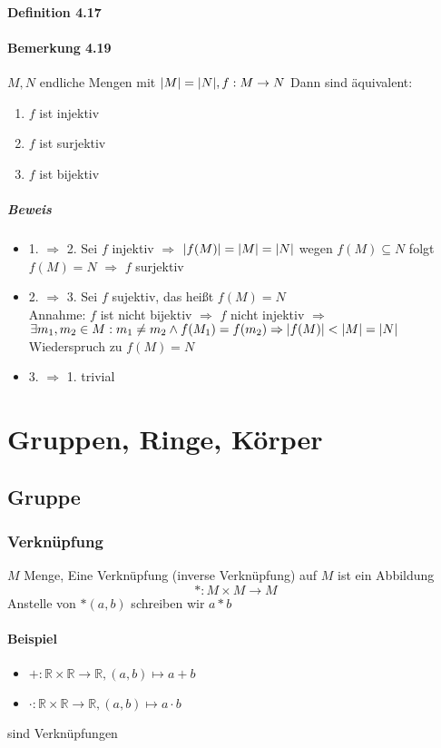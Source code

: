 \documentclass[a4paper]{scrartcl}
\DeclarePairedDelimiter\abs{\lvert}{\rvert}%
\begin{document}
\paragraph{Definition 4.17}
\label{sec-2-6-7-9}
\paragraph{Bemerkung 4.19}
\label{sec-2-6-7-10}
$M,N$ endliche Mengen mit $\abs{M} = \abs{N},f:M\to N$ Dann sind äquivalent:
\begin{enumerate}
\item $f$ ist injektiv
\item $f$ ist surjektiv
\item $f$ ist bijektiv
\end{enumerate}
\subparagraph{Beweis}
\label{sec-2-6-7-10-1}
\begin{itemize}
\item 1. $\Rightarrow$ 2. Sei $f$ injektiv $\Rightarrow$ $\abs{f(M)} = \abs{M} = \abs{N}$ wegen $f(M) \subseteq N$ folgt $f(M) = N$ $\Rightarrow$ $f$ surjektiv
\item 2. $\Rightarrow$ 3. Sei $f$ sujektiv, das heißt $f(M) = N$ \\
        Annahme: $f$ ist nicht bijektiv $\Rightarrow$ $f$ nicht injektiv $\Rightarrow$ $\exists m_1,m_2\in M: m_1\neq m_2 \wedge f(M_1) = f(m_2) \Rightarrow \abs{f(M)} < \abs{M} = \abs{N}$ Wiederspruch zu $f(M) = N$
\item 3. $\Rightarrow$ 1. trivial
\end{itemize}
\section{Gruppen, Ringe, Körper}
\label{sec-3}
\subsection{Gruppe}
\label{sec-3-1}
\subsubsection{Verknüpfung}
\label{sec-3-1-1}
$M$ Menge, Eine Verknüpfung (inverse Verknüpfung) auf $M$ ist ein Abbildung \[*:M\times M \to M\]
Anstelle von $*(a,b)$ schreiben wir $a * b$
\paragraph{Beispiel}
\label{sec-3-1-1-1}
\begin{itemize}
\item $+: \mathbb{R} \times \mathbb{R} \to \mathbb{R},(a,b) \mapsto a + b$
\item $\cdot: \mathbb{R} \times \mathbb{R} \to \mathbb{R},(a,b) \mapsto a\cdot b$
\end{itemize}
sind Verknüpfungen
\end{document}
